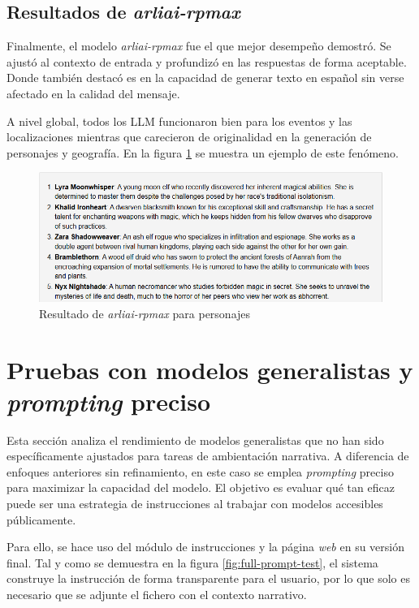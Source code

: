 \subsection{Resultados de \textit{arliai-rpmax}}
Finalmente, el modelo \textit{arliai-rpmax} fue el que mejor desempeño demostró. 
Se ajustó al contexto de entrada y profundizó en las respuestas de forma aceptable.
Donde también destacó es en la capacidad de generar texto en español sin verse afectado
en la calidad del mensaje. 

A nivel global, todos los LLM funcionaron bien para los eventos y las localizaciones
mientras que carecieron de originalidad en la generación de personajes y geografía.
En la figura \ref{fig:rpmax-chars} se muestra un ejemplo de este fenómeno.

\begin{figure}[htbp]
	\centering
	\includegraphics[width=1\textwidth]{./Figures/rpmax-noprompt-chars.png}
	\caption{Resultado de \textit{arliai-rpmax} para personajes}
	\label{fig:rpmax-chars}
\end{figure}

\section{Pruebas con modelos generalistas y \textit{prompting} preciso}
Esta sección analiza el rendimiento de modelos generalistas que no han sido específicamente
ajustados para tareas de ambientación narrativa.
A diferencia de enfoques anteriores sin refinamiento,
en este caso se emplea \textit{prompting} preciso para maximizar la capacidad del modelo.
El objetivo es evaluar qué tan eficaz puede ser una estrategia de instrucciones
al trabajar con modelos accesibles públicamente.

Para ello, se hace uso del módulo de instrucciones y la página \textit{web}
en su versión final. Tal y como se demuestra en la figura \ref{fig:full-prompt-test},
el sistema construye la instrucción de forma transparente para el usuario, por lo que
solo es necesario que se adjunte el fichero con el contexto narrativo.


